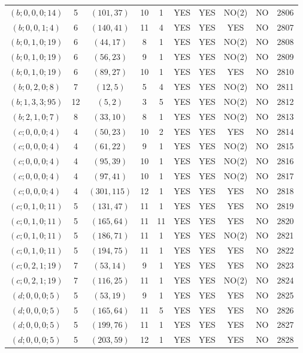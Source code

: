 \begin{longtable}{|c|c|c|c|c|c|c|c|c|c|}
$(b; 0, 0, 0; 14)$ & 5 & $(101, 37)$ & 10 & 1 & YES & YES & NO(2) & NO & 2806\\
$(b; 0, 0, 1; 4)$ & 6 & $(140, 41)$ & 11 & 4 & YES & YES & YES & NO & 2807\\
$(b; 0, 1, 0; 19)$ & 6 & $(44, 17)$ & 8 & 1 & YES & YES & NO(2) & NO & 2808\\
$(b; 0, 1, 0; 19)$ & 6 & $(56, 23)$ & 9 & 1 & YES & YES & NO(2) & NO & 2809\\
$(b; 0, 1, 0; 19)$ & 6 & $(89, 27)$ & 10 & 1 & YES & YES & YES & NO & 2810\\
$(b; 0, 2, 0; 8)$ & 7 & $(12, 5)$ & 5 & 4 & YES & YES & NO(2) & NO & 2811\\
$(b; 1, 3, 3; 95)$ & 12 & $(5, 2)$ & 3 & 5 & YES & YES & NO(2) & NO & 2812\\
$(b; 2, 1, 0; 7)$ & 8 & $(33, 10)$ & 8 & 1 & YES & YES & NO(2) & NO & 2813\\
$(c; 0, 0, 0; 4)$ & 4 & $(50, 23)$ & 10 & 2 & YES & YES & YES & NO & 2814\\
$(c; 0, 0, 0; 4)$ & 4 & $(61, 22)$ & 9 & 1 & YES & YES & NO(2) & NO & 2815\\
$(c; 0, 0, 0; 4)$ & 4 & $(95, 39)$ & 10 & 1 & YES & YES & NO(2) & NO & 2816\\
$(c; 0, 0, 0; 4)$ & 4 & $(97, 41)$ & 10 & 1 & YES & YES & NO(2) & NO & 2817\\
$(c; 0, 0, 0; 4)$ & 4 & $(301, 115)$ & 12 & 1 & YES & YES & YES & NO & 2818\\
$(c; 0, 1, 0; 11)$ & 5 & $(131, 47)$ & 11 & 1 & YES & YES & YES & NO & 2819\\
$(c; 0, 1, 0; 11)$ & 5 & $(165, 64)$ & 11 & 11 & YES & YES & YES & NO & 2820\\
$(c; 0, 1, 0; 11)$ & 5 & $(186, 71)$ & 11 & 1 & YES & YES & NO(2) & NO & 2821\\
$(c; 0, 1, 0; 11)$ & 5 & $(194, 75)$ & 11 & 1 & YES & YES & YES & NO & 2822\\
$(c; 0, 2, 1; 19)$ & 7 & $(53, 14)$ & 9 & 1 & YES & YES & YES & NO & 2823\\
$(c; 0, 2, 1; 19)$ & 7 & $(116, 25)$ & 11 & 1 & YES & YES & NO(2) & NO & 2824\\
$(d; 0, 0, 0; 5)$ & 5 & $(53, 19)$ & 9 & 1 & YES & YES & YES & NO & 2825\\
$(d; 0, 0, 0; 5)$ & 5 & $(165, 64)$ & 11 & 5 & YES & YES & YES & NO & 2826\\
$(d; 0, 0, 0; 5)$ & 5 & $(199, 76)$ & 11 & 1 & YES & YES & YES & NO & 2827\\
$(d; 0, 0, 0; 5)$ & 5 & $(203, 59)$ & 12 & 1 & YES & YES & YES & NO & 2828\\

\end{longtable}
